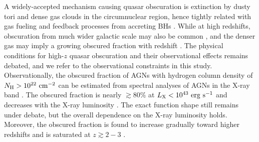 \documentclass[twocolumn, twocolappendix]{aastex63}
\newcommand{\red}[1]{\textcolor{red}{ #1}}
\begin{document}
\begin{CJK*}{UTF8}{gbsn}
A widely-accepted mechanism causing quasar obscuration is extinction by dusty tori and dense gas clouds 
in the circumnuclear region, hence tightly related with gas fueling and feedback processes from accreting BHs 
\citep[see][for a review]{2018ARA&A..56..625H}.
While at high redshifts, obscuration from much wider galactic scale may also be common \citep{2020MNRAS.495.2135N},
and the denser gas may imply a growing obscured fraction with redshift \citep[]{2022arXiv220603508G}. 
The physical conditions for high-$z$ quasar obscuration and their observational effects remains debated,
and we refer to the observational constraints in this study.
Observationally, the obscured fraction of AGNs with hydrogen column density of $N_{\rm H}>10^{22}~{\rm cm}^{-2}$
can be estimated from spectral analyses of AGNs in the X-ray band
\citep[e.g.,][]{2003ApJ...598..886U,2007A&A...463...79G,2008A&A...490..905H}. 
The obscured fraction is nearly $\gtrsim 80\%$ at $L_{\rm X}<10^{43}~{\rm erg~s}^{-1}$ and 
decreases with the X-ray luminosity \citep{2014ApJ...786..104U,2014MNRAS.437.3550M}.
The exact function shape still remains under debate, but the overall dependence on the X-ray luminosity holds.
Moreover, the obscured fraction is found to increase gradually toward higher redshifts and is saturated at $z\gtrsim 2-3$
\citep{2008A&A...490..905H,2014ApJ...786..104U,2014MNRAS.437.3550M,2018MNRAS.473.2378V}.



\end{CJK*}
\end{document}
